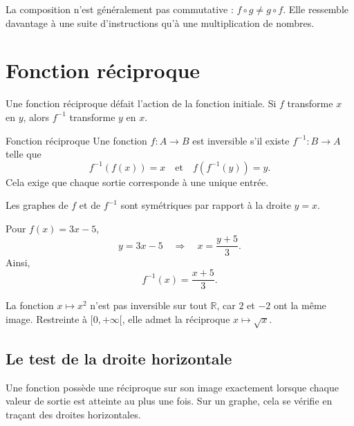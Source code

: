 \documentclass[12pt,a4paper,openany]{book}
\newcommand{\R}{\mathbb{R}}
\begin{document}
\begin{counterbox}
La composition n'est généralement pas commutative : $f\circ g\neq g\circ f$. Elle ressemble davantage à une suite d'instructions qu'à une multiplication de nombres.
\end{counterbox}

\section{Fonction réciproque}

\begin{intuitionbox}
Une fonction réciproque défait l'action de la fonction initiale. Si $f$ transforme $x$ en $y$, alors $f^{-1}$ transforme $y$ en $x$.
\end{intuitionbox}

\begin{definition}{Fonction réciproque}{}
Une fonction $f:A\to B$ est inversible s'il existe $f^{-1}:B\to A$ telle que
\[
f^{-1}(f(x))=x
\quad\text{et}\quad
f(f^{-1}(y))=y.
\]
Cela exige que chaque sortie corresponde à une unique entrée.
\end{definition}

Les graphes de $f$ et de $f^{-1}$ sont symétriques par rapport à la droite $y=x$.

\begin{examplebox}
Pour $f(x)=3x-5$,
\[
y=3x-5\quad\Longrightarrow\quad x=\frac{y+5}{3}.
\]
Ainsi,
\[
f^{-1}(x)=\frac{x+5}{3}.
\]
\end{examplebox}

La fonction $x\mapsto x^2$ n'est pas inversible sur tout $\R$, car $2$ et $-2$ ont la même image. Restreinte à $[0,+\infty[$, elle admet la réciproque $x\mapsto\sqrt x$.

\subsection{Le test de la droite horizontale}

Une fonction possède une réciproque sur son image exactement lorsque chaque valeur de sortie est atteinte au plus une fois. Sur un graphe, cela se vérifie en traçant des droites horizontales.
\end{document}
